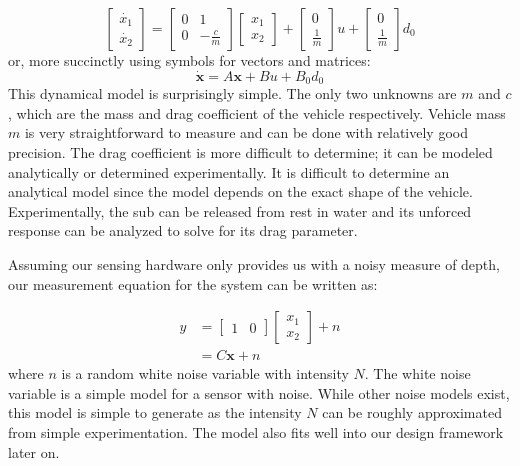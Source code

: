 \documentclass{article}
\begin{document}
\begin{equation*}%
\begin{bmatrix} \dot{x_1} \\ \dot{x_2} \end{bmatrix}=\begin{bmatrix} 0 & 1 \\ 0 & -\frac{c}{m} \end{bmatrix} \begin{bmatrix} x_1 \\ x_2 \end{bmatrix} + \begin{bmatrix} 0 \\ \frac{1}{m} \end{bmatrix}u + \begin{bmatrix} 0 \\ \frac{1}{m} \end{bmatrix}d_0
\end{equation*}
or, more succinctly using symbols for vectors and matrices:
\begin{equation}
\label{eq:system}
\pmb{\dot{x}}=A\pmb{x}+Bu+B_0d_0
\end{equation}
This dynamical model is surprisingly simple.  The only two unknowns are $m$ and $c$, which are the mass and drag coefficient of the vehicle respectively.  Vehicle mass $m$ is very straightforward to measure and can be done with relatively good precision.  The drag coefficient is more difficult to determine; it can be modeled analytically or determined experimentally.  It is difficult to determine an analytical model since the model depends on the exact shape of the vehicle.  Experimentally, the sub can be released from rest in water and its unforced response can be analyzed to solve for its drag parameter.  

Assuming our sensing hardware only provides us with a noisy measure of depth, our measurement equation for the system can be written as:

\begin{equation}
\begin{split}
\label{eq:measurement}
y&=\begin{bmatrix} 1 & 0 \end{bmatrix} \begin{bmatrix} x_1 \\ x_2 \end{bmatrix} + n \\
&=C\pmb{x}+n
\end{split}
\end{equation}
where $n$ is a random white noise variable with intensity $N$.  The white noise variable is a simple model for a sensor with noise.  While other noise models exist, this model is simple to generate as the intensity $N$ can be roughly approximated from simple experimentation.  The model also fits well into our design framework later on.
\end{document}

